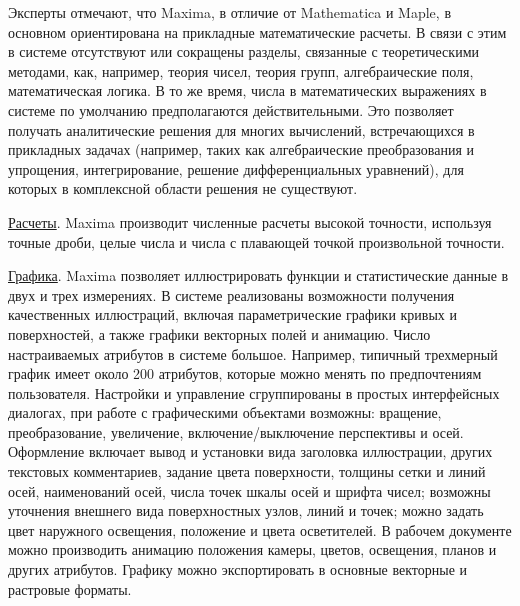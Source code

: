 Эксперты отмечают, что Maxima, в отличие от Mathematica и Maple, в основном ориентирована на прикладные математические расчеты. В связи с этим в системе отсутствуют или сокращены разделы, связанные с теоретическими методами, как, например, теория чисел, теория групп, алгебраические поля, математическая логика. В то же время, числа в математических выражениях в системе по умолчанию предполагаются действительными. Это позволяет получать аналитические решения для многих вычислений, встречающихся в прикладных задачах (например, таких как алгебраические преобразования и упрощения, интегрирование, решение дифференциальных уравнений), для которых в комплексной области решения не существуют.

\underline{Расчеты}. Maxima производит численные расчеты высокой точности, используя точные дроби, целые числа и числа с плавающей точкой произвольной точности.

\underline{Графика}. Maxima позволяет иллюстрировать функции и статистические данные в двух и трех измерениях. В системе реализованы возможности получения качественных иллюстраций, включая параметрические графики кривых и поверхностей, а также графики векторных полей и анимацию. Число настраиваемых атрибутов в системе большое. Например, типичный трехмерный график имеет около 200 атрибутов, которые можно менять по предпочтениям пользователя. Настройки и управление сгруппированы в простых интерфейсных диалогах, при работе с графическими объектами возможны: вращение, преобразование, увеличение, включение/выключение перспективы и осей. Оформление включает вывод и установки вида заголовка иллюстрации, других текстовых комментариев, задание цвета поверхности, толщины сетки и линий осей, наименований осей, числа точек шкалы осей и шрифта чисел; возможны уточнения внешнего вида поверхностных узлов, линий и точек; можно задать цвет наружного освещения, положение и цвета осветителей. В рабочем документе можно производить анимацию положения камеры, цветов, освещения, планов и других атрибутов. Графику можно экспортировать в основные векторные и растровые форматы.

